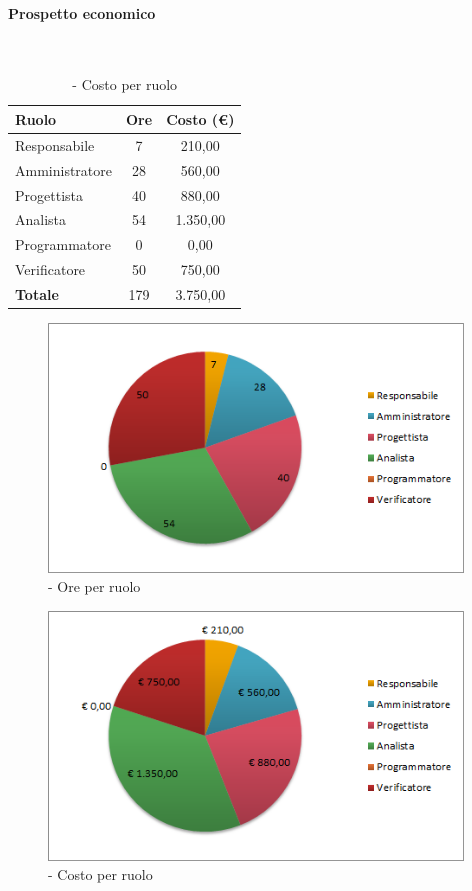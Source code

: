 \documentclass[./PianoDiProgetto.tex]{subfiles}
\begin{document}
	\paragraph{Prospetto economico}\
					
	\begin{table}[H]
		\centering
	
		\begin{tabular}{l * {2}{c}}
			\toprule
			\textbf{Ruolo} & \textbf{Ore} & \textbf{Costo (\euro{})} \\
			\midrule
			Responsabile & 7    & 210,00 \\
			Amministratore  & 28    & 560,00 \\
			Progettista  & 40    & 880,00 \\
			Analista & 54    & 1.350,00 \\
			Programmatore  & 0    & 0,00 \\
			Verificatore  & 50    & 750,00 \\
			\midrule
			\textbf{Totale}  & 179   & 3.750,00 \\
			\bottomrule
		\end{tabular}
		\caption{\PerPA{} - Costo per ruolo}
	\end{table}
\vfill	
	
	\begin{figure}[H]
		\centering
		\includegraphics[width=11cm, trim=1cm 0cm 1cm 0cm]{grafici/PA-ruolo}
			\caption{\PerPA{} - Ore per ruolo}
	\end{figure}
\vfill	
\newpage
\vfill
	\begin{figure}[H]
		\centering
		\includegraphics[width=11cm, trim=1cm 0cm 1cm 0cm]{grafici/PA-costo}
			\caption{\PerPA{} - Costo per ruolo}
	\end{figure}	
\vfill	
\end{document}
